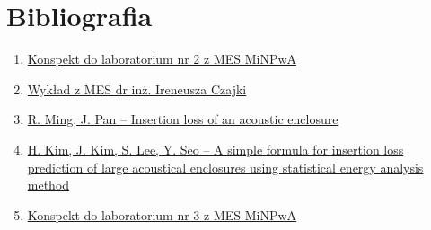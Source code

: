 \documentclass{sprawozdanie-agh}
\begin{document}
\section{Bibliografia}
\renewcommand\labelenumi{[\theenumi]}
\begin{enumerate}
    \item \href{http://home.agh.edu.pl/~iczajka/assets/pliki/MiNPwA2018_2.pdf}{\label{ref1}Konspekt do laboratorium nr 2 z MES MiNPwA}
    \item \href{http://home.agh.edu.pl/~iczajka/assets/pliki/MiNPwA_wyklad1-nup.pdf}{\label{ref2}Wykład z MES dr inż. Ireneusza Czajki}
    \item \href{https://asa.scitation.org/doi/pdf/10.1121/1.1819377}{\label{ref3}R. Ming, J. Pan -- Insertion loss of an acoustic enclosure}
    \item \href{https://www.sciencedirect.com/science/article/pii/S2092678216302618}{\label{ref4}H. Kim, J. Kim, S. Lee, Y. Seo -- A simple formula for insertion loss prediction of large acoustical enclosures using statistical energy analysis method}
    \item \href{http://home.agh.edu.pl/~iczajka/assets/pliki/MiNPwA2018_3.pdf}{\label{ref5}Konspekt do laboratorium nr 3 z MES MiNPwA}
\end{enumerate}
\end{document}
